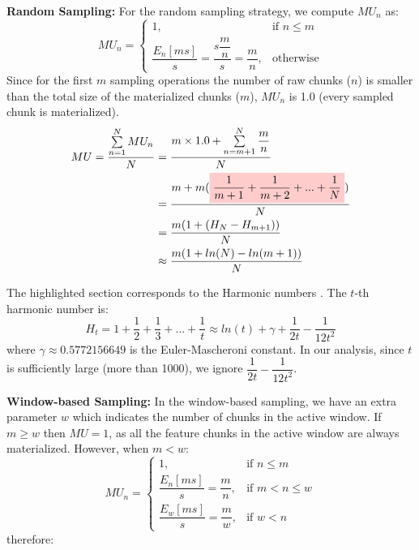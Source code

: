 \textbf{Random Sampling:} 
For the random sampling strategy, we compute $MU_n$ as:
\begin{equation*}
MU_n = 
\begin{cases}
    1, 	&\text{if } n \leq m\\
     \dfrac{E_n[ms]}{s} = \dfrac{s\dfrac{m}{n}}{s} = \dfrac{m}{n},   & \text{otherwise}
\end{cases}
\end{equation*}
Since for the first $m$ sampling operations the number of raw chunks ($n$) is smaller than the total size of the materialized chunks ($m$), $MU_n$ is 1.0 (every sampled chunk is materialized).
\newcommand{\highlight}[1]{\colorbox{red!20}{$\displaystyle#1$}}
\begin{equation} \label{formula-uniform}
\begin{aligned}
MU=\dfrac{\sum\limits_{n=1}^N MU_n}{N}
&=\dfrac{m \times 1.0 + \sum\limits_{n = m+1}^{N} \dfrac{m}{n}}{N} \\
&=\dfrac{m  +  m (\highlight{\dfrac{1}{m+1} +\dfrac{1}{m+2}  + ... + \dfrac{1}{N}}) }{N}\\
&=\dfrac{m(1 + (H_N - H_{m+1}))}{N}\\
&\approx \dfrac{m( 1+ln(N) - ln(m+1))}{N}
\end{aligned}
\end{equation}

The highlighted section corresponds to the Harmonic numbers \cite{sun2012arithmetic}.
The $t$-th harmonic number is:
\begin{equation*}
H_t = 1 + \dfrac{1}{2} + \dfrac{1}{3} + ... + \dfrac{1}{t} \approx ln(t) + \gamma + \dfrac{1}{2t} - \dfrac{1}{12t^2}
\end{equation*}
where $\gamma \approx 0.5772156649$ is the Euler-Mascheroni constant.
In our analysis, since $t$ is sufficiently large (more than 1000), we ignore $\dfrac{1}{2t} - \dfrac{1}{12t^2}$.

\textbf{Window-based Sampling:}
In the window-based sampling, we have an extra parameter $w$ which indicates the number of chunks in the active window.
If $m \geq w$ then $MU=1$, as all the feature chunks in the active window are always materialized.
However, when $m < w$:
\begin{equation*}
MU_n = 
\begin{cases}
    1, 	&\text{if } n \leq m\\
     \dfrac{E_n[ms]}{s} = \dfrac{m}{n},   &\text{if } m < n \leq w\\
      \dfrac{E_w[ms]}{s} = \dfrac{m}{w},  &\text{if } w < n
\end{cases}
\end{equation*}
therefore: 

